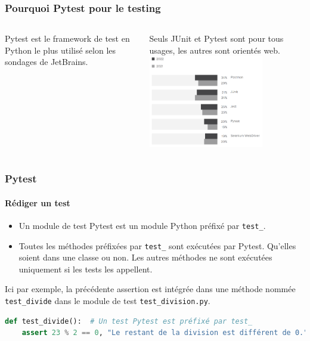 \documentclass{beamer}
\begin{document}
    \begin{frame}
        \frametitle{Pourquoi Pytest pour le testing}
        \transdissolve
        \begin{columns}
            Pytest est le framework de test en Python le plus utilisé selon les sondages de JetBrains\footnotemark.

            Seuls JUnit et Pytest sont pour tous usages, les autres sont orientés web.
            \centering
            \includegraphics[width=5cm]{image/jetbrains-survey-testing-framework.png}
        \end{columns}

    \end{frame}

    \begin{frame}[fragile]
        \frametitle{Pytest}
        \framesubtitle{Rédiger un test}
        \transdissolve
        \begin{itemize}
            \item Un module de test Pytest est un module Python préfixé par \lstinline{test_}.

            \item Toutes les méthodes préfixées par \lstinline{test_} sont exécutées par Pytest.
            Qu'elles soient dans une classe ou non.
            Les autres méthodes ne sont exécutées uniquement si les tests les appellent.
        \end{itemize}
        Ici par exemple, la précédente assertion est intégrée dans une méthode nommée \lstinline{test_divide} dans le module de test \lstinline{test_division.py}.
        \begin{lstlisting}[language=Python]
def test_divide():  # Un test Pytest est préfixé par test_
    assert 23 % 2 == 0, "Le restant de la division est différent de 0."
        \end{lstlisting}
    \end{frame}
\end{document}
